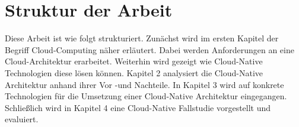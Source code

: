 \section{Struktur der Arbeit}
Diese Arbeit ist wie folgt strukturiert. Zunächst wird im ersten Kapitel der Begriff Cloud-Computing näher erläutert. Dabei werden Anforderungen an eine Cloud-Architektur erarbeitet. Weiterhin wird gezeigt wie Cloud-Native Technologien diese lösen können. Kapitel 2 analysiert die Cloud-Native Architektur anhand ihrer Vor -und Nachteile. In Kapitel 3 wird auf konkrete Technologien für die Umsetzung einer Cloud-Native Architektur eingegangen. Schließlich wird in Kapitel 4 eine Cloud-Native Fallstudie vorgestellt und evaluiert.  

